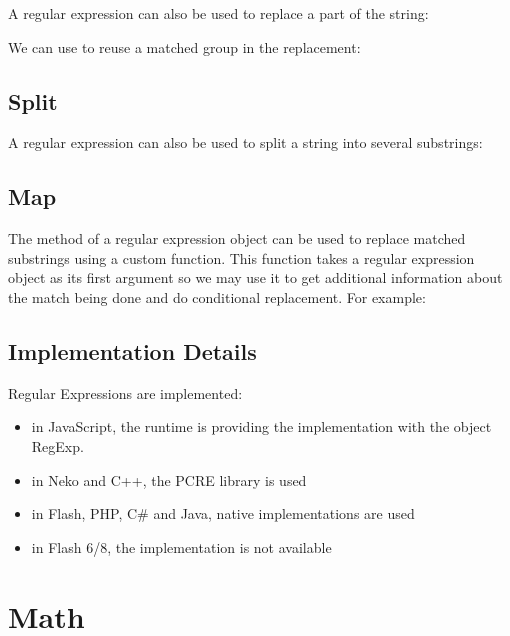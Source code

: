 A regular expression can also be used to replace a part of the string:


We can use  to reuse a matched group in the replacement:


\subsection{Split}
\label{std-regex-split}

A regular expression can also be used to split a string into several substrings:


\subsection{Map}
\label{std-regex-map}

The  method of a regular expression object can be used to replace matched substrings using a custom function. This function takes a regular expression object as its first argument so we may use it to get additional information about the match being done and do conditional replacement. For example:



\subsection{Implementation Details}
\label{std-regex-implementation-details}

Regular Expressions are implemented:

\begin{itemize}
	\item in JavaScript, the runtime is providing the implementation with the object RegExp.
	\item in Neko and C++, the PCRE library is used
	\item in Flash, PHP, C\# and Java, native implementations are used
	\item in Flash 6/8, the implementation is not available
\end{itemize}


\section{Math}
\label{std-math}

